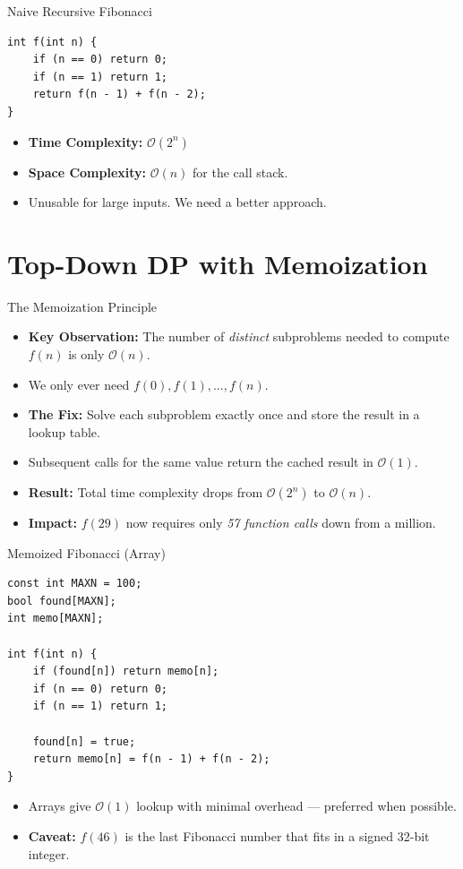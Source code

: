 \documentclass{beamer}
\begin{document}
\begin{frame}[fragile]{Naive Recursive Fibonacci}
\begin{Verbatim}[fontsize=\small]
int f(int n) {
    if (n == 0) return 0;
    if (n == 1) return 1;
    return f(n - 1) + f(n - 2);
}
\end{Verbatim}
    \vspace{0.5em}
    \begin{itemize}
        \item \textbf{Time Complexity:} $\mathcal{O}(2^n)$
        \item \textbf{Space Complexity:} $\mathcal{O}(n)$ for the call stack.
        \item Unusable for large inputs. We need a better approach.
    \end{itemize}
\end{frame}

\section{Top-Down DP with Memoization}

\begin{frame}{The Memoization Principle}
    \begin{itemize}
        \item \textbf{Key Observation:} The number of \textit{distinct} subproblems needed to compute $f(n)$ is only $\mathcal{O}(n)$.
        \item We only ever need $f(0), f(1), \dots, f(n)$.
        \item \textbf{The Fix:} Solve each subproblem exactly once and store the result in a lookup table.
        \item Subsequent calls for the same value return the cached result in $\mathcal{O}(1)$.
        \item \textbf{Result:} Total time complexity drops from $\mathcal{O}(2^n)$ to $\mathcal{O}(n)$.
        \item \textbf{Impact:} $f(29)$ now requires only \textit{57 function calls} down from a million.
    \end{itemize}
\end{frame}

\begin{frame}[fragile]{Memoized Fibonacci (Array)}
\begin{Verbatim}[fontsize=\small]
const int MAXN = 100;
bool found[MAXN];
int memo[MAXN];

int f(int n) {
    if (found[n]) return memo[n];
    if (n == 0) return 0;
    if (n == 1) return 1;

    found[n] = true;
    return memo[n] = f(n - 1) + f(n - 2);
}
\end{Verbatim}
    \vspace{0.5em}
    \begin{itemize}
        \item Arrays give $\mathcal{O}(1)$ lookup with minimal overhead --- preferred when possible.
        \item \textbf{Caveat:} $f(46)$ is the last Fibonacci number that fits in a signed 32-bit integer.
    \end{itemize}
\end{frame}
\end{document}
